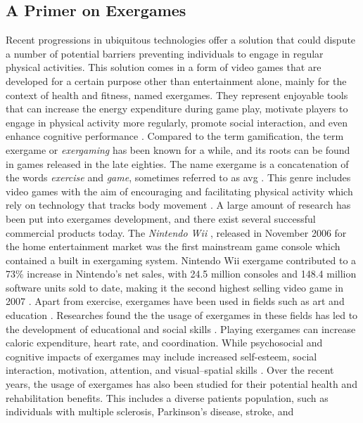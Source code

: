 \subsection{A Primer on Exergames}
Recent progressions in ubiquitous technologies offer a solution that could dispute a number of potential barriers preventing individuals to engage in regular physical activities. This solution comes in a form of video games that are developed for a certain purpose other than entertainment alone, mainly for the context of health and fitness, named exergames. They represent enjoyable tools that can increase the energy expenditure during game play, motivate players to engage in physical activity more regularly, promote social interaction, and even enhance cognitive performance \cite{staiano2011exergames}. Compared to the term gamification, the term exergame or \textit{exergaming} has been known for a while, and its roots can be found in games released in the late eighties. The name exergame is a concatenation of the words \textit{exercise} and \textit{game}, sometimes referred to as \acrfull{avg}  \cite{altamimi2012survey}. This genre includes video games with the aim of encouraging and facilitating physical activity which rely on technology that tracks body movement  \cite{altamimi2012survey}. A large amount of research has been put into exergames development, and there exist several successful commercial
products today. The \textit{Nintendo Wii} \cite{wii}, released in November 2006 for the home entertainment market was the first mainstream game console which contained a built in exergaming system. Nintendo Wii exergame contributed to a 73\% increase in Nintendo's net sales, with 24.5 million consoles and 148.4 million software units sold to date, making it the second highest selling video game in 2007 \cite{staiano2011exergames}. Apart from exercise, exergames have been used in fields such as art and education \cite{altamimi2012survey}. Researches found the the usage of exergames in these fields has led to the 
development of educational and social skills \cite{altamimi2012survey}. Playing exergames can increase caloric expenditure, heart rate, and coordination. While psychosocial and cognitive impacts of exergames may include increased self-esteem, social interaction, motivation, attention, and visual–spatial skills \cite{staiano2011exergames}. Over the recent years, the usage of exergames has also been studied for their potential health and rehabilitation benefits. This includes a diverse patients population, such as individuals with multiple sclerosis, Parkinson’s disease, stroke, and
